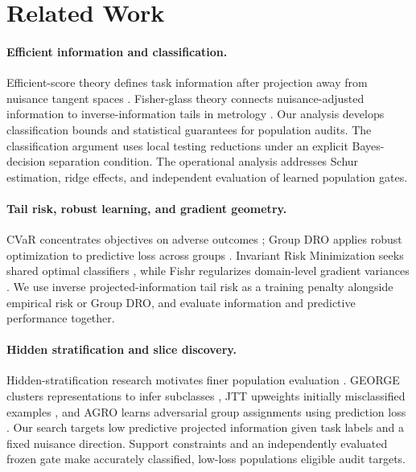 \section{Related Work}
\label{sec:related-work}

\paragraph{Efficient information and classification.}
Efficient-score theory defines task information after projection away from nuisance tangent spaces \citep{bickel1993efficient,newey1990semiparametric,tsiatis2006semiparametric}. Fisher-glass theory connects nuisance-adjusted information to inverse-information tails in metrology \citep{mansouri_arai_2026_fisher_glasses}. Our analysis develops classification bounds and statistical guarantees for population audits. The classification argument uses local testing reductions \citep{lecam1986asymptotic,tsybakov2009introduction} under an explicit Bayes-decision separation condition. The operational analysis addresses Schur estimation, ridge effects, and independent evaluation of learned population gates.

\paragraph{Tail risk, robust learning, and gradient geometry.}
CVaR concentrates objectives on adverse outcomes \citep{rockafellar2000optimization,rockafellar2002conditional}; Group DRO applies robust optimization to predictive loss across groups \citep{sagawa2019distributionally}. Invariant Risk Minimization seeks shared optimal classifiers \citep{arjovsky2019invariant}, while Fishr regularizes domain-level gradient variances \citep{rame2022fishr}. We use inverse projected-information tail risk as a training penalty alongside empirical risk or Group DRO, and evaluate information and predictive performance together.

\paragraph{Hidden stratification and slice discovery.}
Hidden-stratification research motivates finer population evaluation \citep{oakdenrayner2020hidden}. GEORGE clusters representations to infer subclasses \citep{sohoni2020no}, JTT upweights initially misclassified examples \citep{liu2021just}, and AGRO learns adversarial group assignments using prediction loss \citep{paranjape2022agro}. Our search targets low predictive projected information given task labels and a fixed nuisance direction. Support constraints and an independently evaluated frozen gate make accurately classified, low-loss populations eligible audit targets.

